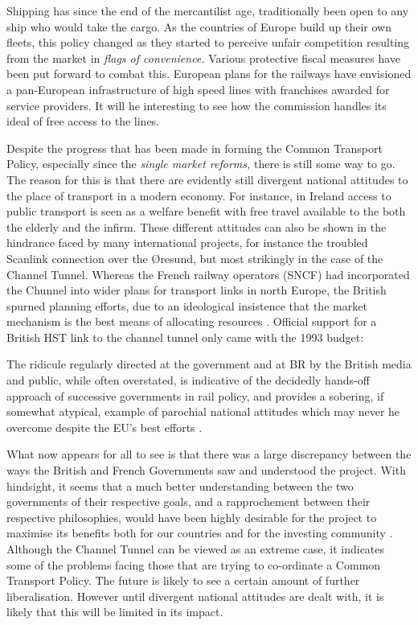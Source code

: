Shipping has since the end of the mercantilist age, traditionally been open to any ship who would take the cargo. As the countries of Europe build up their own fleets, this policy changed as they started to perceive unfair competition resulting from the market in \textit{flags of convenience.} Various protective fiscal measures have been put forward to combat this. European plans for the railways have envisioned a pan-European infrastructure of high speed lines with franchises awarded for service providers. It will he interesting to see how the commission handles its ideal of free access to the lines.

Despite the progress that has been made in forming the Common Transport Policy, especially since the \textit{single market reforms,} there is still some way to go. The reason for this is that there are evidently still divergent national attitudes to the place of transport in a modern economy. For instance, in Ireland access to public transport is seen as a welfare benefit with free travel available to the both the elderly and the infirm. These different attitudes can also be shown in the hindrance faced by many international projects, for instance the troubled Scanlink connection over the \O resund, but most strikingly in the case of the Channel Tunnel. Whereas the French railway operators (SNCF) had incorporated the Chunnel into wider plans for transport links in north Europe, the British spurned planning efforts, due to an ideological insistence that the market mechanism is the best means of allocating resources \cite{Anderson:1992}. Official support for a British HST link to the channel tunnel only came with the 1993 budget:

\begin{displayquote}
The ridicule regularly directed at the government and at BR by the British media and public, while often overstated, is indicative of the decidedly hands-off approach of successive governments in rail policy, and provides a sobering, if somewhat atypical, example of parochial national attitudes which may never he overcome despite the EU's best efforts \cite{Ross:1994}.
\end{displayquote}

What now appears for all to see is that there was a large discrepancy between the ways the British and French Governments saw and understood the project. With hindsight, it seems that a much better understanding between the two governments of their respective goals, and a rapprochement between their respective philosophies, would have been highly desirable for the project to maximise its benefits both for our countries and for the investing community \cite{Bernard:1994}. Although the Channel Tunnel can be viewed as an extreme case, it indicates some of the problems facing those that are trying to co-ordinate a Common Transport Policy. The future is likely to see a certain amount of further liberalisation. However until divergent national attitudes are dealt with, it is likely that this will be limited in its impact.